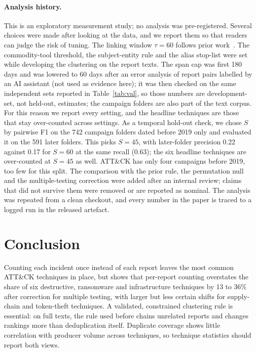 \documentclass[runningheads]{llncs}
\newcommand{\attack}{ATT\&CK}
\begin{document}
\paragraph{Analysis history.} This is an exploratory measurement study; no analysis was pre-registered. Several choices were made after looking at the data, and we report them so that readers can judge the risk of tuning. The linking window $\tau = 60$ follows prior work~\cite{rahman2024arsenal}. The commodity-tool threshold, the subject-entity rule and the alias stop-list were set while developing the clustering on the report texts. The span cap was first 180 days and was lowered to 60 days after an error analysis of report pairs labelled by an AI assistant (not used as evidence here); it was then checked on the same independent sets reported in Table~\ref{tab:val}, so those numbers are development-set, not held-out, estimates; the campaign folders are also part of the text corpus. For this reason we report every setting, and the headline techniques are those that stay over-counted across settings. As a temporal hold-out check, we chose $S$ by pairwise F1 on the 742 campaign folders dated before 2019 only and evaluated it on the 591 later folders. This picks $S = 45$, with later-folder precision 0.22 against 0.17 for $S = 60$ at the same recall (0.63); the six headline techniques are over-counted at $S = 45$ as well. \attack{} has only four campaigns before 2019, too few for this split. The comparison with the prior rule, the permutation null and the multiple-testing correction were added after an internal review; claims that did not survive them were removed or are reported as nominal. The analysis was repeated from a clean checkout, and every number in the paper is traced to a logged run in the released artefact.

\section{Conclusion}

Counting each incident once instead of each report leaves the most common \attack{} techniques in place, but shows that per-report counting overstates the share of six destructive, ransomware and infrastructure techniques by 13 to 36\% after correction for multiple testing, with larger but less certain shifts for supply-chain and token-theft techniques. A validated, constrained clustering rule is essential: on full texts, the rule used before chains unrelated reports and changes rankings more than deduplication itself. Duplicate coverage shows little correlation with producer volume across techniques, so technique statistics should report both views.
\end{document}
